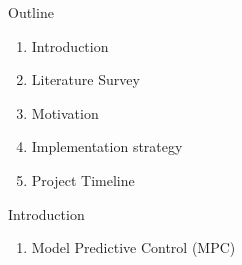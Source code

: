 \documentclass{beamer}
\begin{document}
\begin{frame}\titlepage\end{frame}


\begin{frame}{Outline}
    \begin{enumerate}
        \item Introduction
        \item Literature Survey
        \item Motivation
        \item Implementation strategy
        \item Project Timeline
    \end{enumerate}
\end{frame}


\begin{frame}{Introduction}
    \begin{enumerate}
        \item Model Predictive Control (MPC)
    \end{enumerate}
\end{frame}\normalfont
\end{document}

